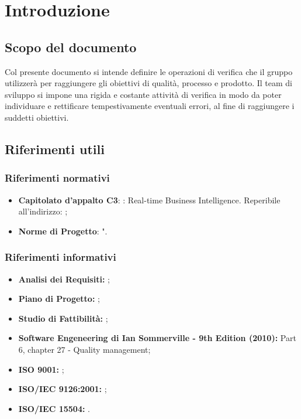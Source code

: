 
\section{Introduzione}
	
	\subsection{Scopo del documento}
		Col presente documento si intende definire le operazioni di verifica che il gruppo \groupname{} utilizzerà per raggiungere gli obiettivi di qualità, processo e prodotto. Il team di sviluppo si impone una rigida e costante attività di verifica in modo da poter individuare e rettificare tempestivamente eventuali errori, al fine di raggiungere i suddetti obiettivi. 
	
	

	\subsection{Riferimenti utili}
		

		\subsubsection{Riferimenti normativi}
			\begin{itemize}
				\item \textbf{Capitolato d'appalto C3}: \projectname{}: Real-time Business Intelligence. Reperibile all'indirizzo: ;
				\item \textbf{Norme di Progetto}: ".
			\end{itemize}
		

		\subsubsection{Riferimenti informativi}
			\begin{itemize}
				\item \textbf{Analisi dei Requisiti:} ;
				\item \textbf{Piano di Progetto:} ;
				\item \textbf{Studio di Fattibilità:} ;
				\item \textbf{Software Engeneering di Ian Sommerville - 9th Edition (2010):} Part 6, chapter 27 - Quality management;
				\item \textbf{ISO 9001:} ;
				\item \textbf{ISO/IEC 9126:2001:} ;
				\item \textbf{ISO/IEC 15504:} .
			\end{itemize}
